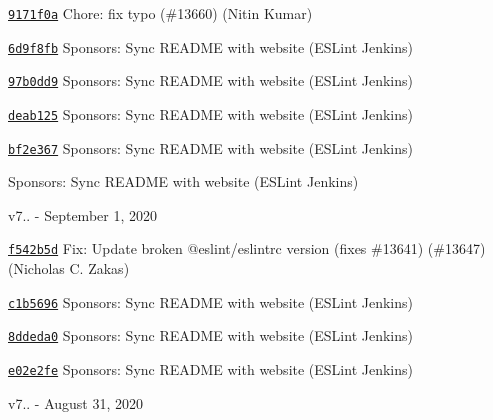 \begin{DoxyItemize}
\item \href{https://github.com/eslint/eslint/commit/9171f0a99bb4d7c53f109b1c2b215004a7c27713}{\texttt{ {\ttfamily 9171f0a}}} Chore\+: fix typo (\#13660) (Nitin Kumar)
\item \href{https://github.com/eslint/eslint/commit/6d9f8fbb7ed4361b475fb50d04e6d25744d5b1a2}{\texttt{ {\ttfamily 6d9f8fb}}} Sponsors\+: Sync README with website (ESLint Jenkins)
\item \href{https://github.com/eslint/eslint/commit/97b0dd9a1af1ae4ae3857adcfe6eeac7837101ed}{\texttt{ {\ttfamily 97b0dd9}}} Sponsors\+: Sync README with website (ESLint Jenkins)
\item \href{https://github.com/eslint/eslint/commit/deab125fc9220dab43baeb32c6cf78942ad25a83}{\texttt{ {\ttfamily deab125}}} Sponsors\+: Sync README with website (ESLint Jenkins)
\item \href{https://github.com/eslint/eslint/commit/bf2e367bf4f6fde9930af9de8b8d8bc3d8b5782f}{\texttt{ {\ttfamily bf2e367}}} Sponsors\+: Sync README with website (ESLint Jenkins)
\item \href{https://github.com/eslint/eslint/commit/89292084bf91ba5ae5bf966c6c56fa3da139ce57}{\texttt{ {}}} Sponsors\+: Sync README with website (ESLint Jenkins)
\end{DoxyItemize}

v7.. -\/ September 1, 2020


\begin{DoxyItemize}
\item \href{https://github.com/eslint/eslint/commit/f542b5d0679b73326ad249fc44a54c3f848bd3e6}{\texttt{ {\ttfamily f542b5d}}} Fix\+: Update broken @eslint/eslintrc version (fixes \#13641) (\#13647) (Nicholas C. Zakas)
\item \href{https://github.com/eslint/eslint/commit/c1b56966c2354e12d16e8394443de49fa54f4290}{\texttt{ {\ttfamily c1b5696}}} Sponsors\+: Sync README with website (ESLint Jenkins)
\item \href{https://github.com/eslint/eslint/commit/8ddeda01afdb1e9656a43853b8e25c9c4582e6ad}{\texttt{ {\ttfamily 8ddeda0}}} Sponsors\+: Sync README with website (ESLint Jenkins)
\item \href{https://github.com/eslint/eslint/commit/e02e2fe019a1ed9a34a7b96e4c8961c35093b0ce}{\texttt{ {\ttfamily e02e2fe}}} Sponsors\+: Sync README with website (ESLint Jenkins)
\end{DoxyItemize}

v7.. -\/ August 31, 2020


